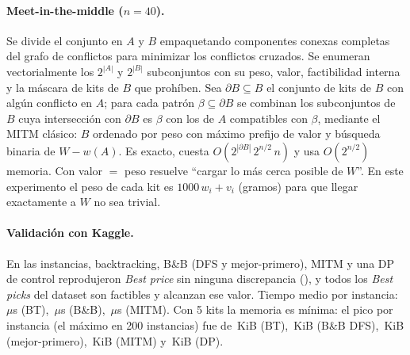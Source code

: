 \documentclass[11pt]{article}
\theoremstyle{remark}
\begin{document}
\paragraph{Meet-in-the-middle ($n=40$).} Se divide el conjunto en $A$ y $B$ empaquetando componentes
conexas completas del grafo de conflictos para minimizar los conflictos cruzados. Se enumeran
vectorialmente los $2^{|A|}$ y $2^{|B|}$ subconjuntos con su peso, valor, factibilidad interna y la
máscara de kits de $B$ que prohíben. Sea $\partial B\subseteq B$ el conjunto de kits de $B$ con algún
conflicto en $A$; para cada patrón $\beta\subseteq\partial B$ se combinan los subconjuntos de $B$ cuya
intersección con $\partial B$ es $\beta$ con los de $A$ compatibles con $\beta$, mediante el MITM
clásico: $B$ ordenado por peso con máximo prefijo de valor y búsqueda binaria de $W-w(A)$. Es exacto,
cuesta $O(2^{|\partial B|}\,2^{n/2}\,n)$ y usa $O(2^{n/2})$ memoria. Con valor $=$ peso resuelve
``cargar lo más cerca posible de $W$''. En este experimento el peso de cada kit es
$1000\,w_i+v_i$ (gramos) para que llegar exactamente a $W$ no sea trivial.

\paragraph{Validación con Kaggle.} En las \kagInst{} instancias, backtracking, B\&B (DFS y
mejor-primero), MITM y una DP de control reprodujeron \emph{Best price} sin ninguna discrepancia
(\kagDisc), y todos los \emph{Best picks} del dataset son factibles y alcanzan ese valor. Tiempo medio
por instancia: \kagTBt\,$\mu$s (BT), \kagTBnb\,$\mu$s (B\&B), \kagTMitm\,$\mu$s (MITM). Con 5 kits la
memoria es mínima: el pico por instancia (el máximo en 200 instancias) fue de \kagMemBt\,KiB (BT),
\kagMemBnb\,KiB (B\&B DFS), \kagMemBest\,KiB (mejor-primero), \kagMemMitm\,KiB (MITM) y \kagMemDp\,KiB (DP).
\end{document}
